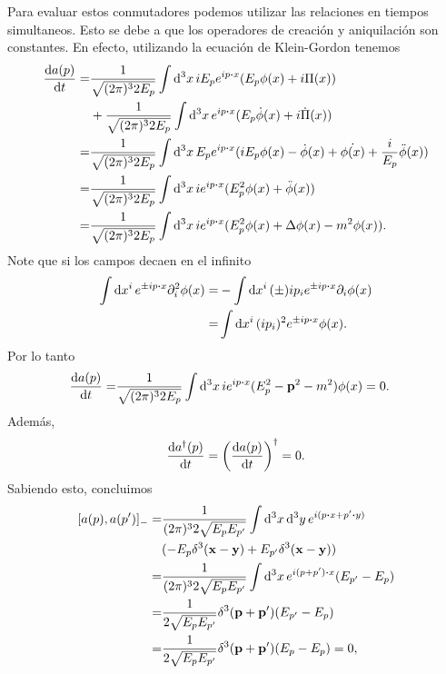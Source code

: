 \documentclass{article}
\begin{document}
Para evaluar estos conmutadores podemos utilizar las relaciones en tiempos simultaneos. Esto se debe a que los operadores de creación y aniquilación son constantes. En efecto, utilizando la ecuación de Klein-Gordon tenemos
\begin{align}
\begin{split}
\dv{a(p)}{t}=&\frac{1}{\sqrt{(2\pi)^32E_p}}\int \dd[3]{x}iE_pe^{ip\vdot x}(E_p\phi(x)+i\Pi(x))\\
&+\frac{1}{\sqrt{(2\pi)^32E_p}}\int \dd[3]{x}e^{ip\vdot x}(E_p\dot{\phi}(x)+i\dot{\Pi}(x))\\
=&\frac{1}{\sqrt{(2\pi)^32E_p}}\int \dd[3]{x}E_pe^{ip\vdot x}(iE_p\phi(x)-\dot{\phi}(x)+\dot{\phi(x)}+\frac{i}{E_p}\ddot{\phi}(x))\\
=&\frac{1}{\sqrt{(2\pi)^32E_p}}\int \dd[3]{x}ie^{ip\vdot x}(E_p^2\phi(x)+\ddot{\phi}(x))\\
=&\frac{1}{\sqrt{(2\pi)^32E_p}}\int \dd[3]{x}ie^{ip\vdot x}(E_p^2\phi(x)+\Delta\phi(x)-m^2\phi(x)).
\end{split}
\end{align}
Note que si los campos decaen en el infinito
\begin{align}
\begin{split}
\int \dd{x^i}e^{\pm ip\vdot x}\partial_i^2\phi(x)=&-\int\dd{x^i}(\pm) ip_ie^{\pm ip\vdot x}\partial_i\phi(x)\\
=&\int\dd{x^i}(ip_i)^2e^{\pm ip\vdot x}\phi(x).
\end{split}
\end{align}
Por lo tanto
\begin{align}
\begin{split}
\dv{a(p)}{t}=&\frac{1}{\sqrt{(2\pi)^32E_p}}\int \dd[3]{x}ie^{ip\vdot x}(E_p^2-\vb{p}^2-m^2)\phi(x)=0.
\end{split}
\end{align}
Además,
\begin{equation}
\dv{a^\dagger(p)}{t}=\qty(\dv{a(p)}{t})^\dagger=0.
\end{equation}
Sabiendo esto, concluimos
\begin{align}
\begin{split}
[a(p),a(p')]_-=&\frac{1}{(2\pi)^32\sqrt{E_pE_{p'}}}\int \dd[3]{x}\dd[3]{y}e^{i(p\vdot x+p'\vdot y)}\\
&(-E_p\delta^3(\vb{x}-\vb{y})+E_{p'}\delta^3(\vb{x}-\vb{y}))\\
=&\frac{1}{(2\pi)^32\sqrt{E_pE_{p'}}}\int \dd[3]{x}e^{i(p+p')\vdot x}(E_{p'}-E_p)\\
=&\frac{1}{2\sqrt{E_pE_{p'}}}\delta^3(\vb{p}+\vb{p'})(E_{p'}-E_p)\\
=&\frac{1}{2\sqrt{E_pE_{p'}}}\delta^3(\vb{p}+\vb{p'})(E_p-E_p)=0,
\end{split}
\end{align}
\end{document}
